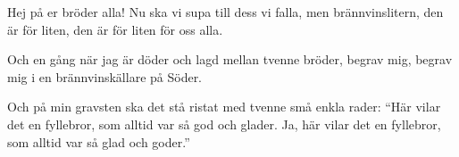 \begin{song}

\begin{songmeta}
\end{songmeta}

\begin{songtext}
Hej på er bröder alla!
Nu ska vi supa till dess vi falla,
men brännvinslitern, den är för liten,
den är för liten för oss alla.

Och en gång när jag är döder
och lagd mellan tvenne bröder,
begrav mig, begrav mig
i en brännvinskällare på Söder.

Och på min gravsten ska det stå ristat
med tvenne små enkla ra­der:
\textquotedblleft{}Här vilar det en fyllebror,
som alltid var så god och glader.
Ja, här vilar det en fyllebror,
som alltid var så glad och goder.\textquotedblright{}
\end{songtext}
\end{song}
